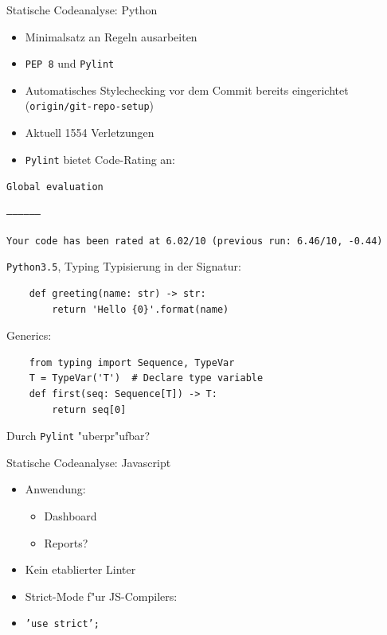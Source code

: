 \documentclass{beamer}
\newcommand{\cmark}{\ding{51}}
\begin{document}
\begin{frame}{Statische Codeanalyse: Python}
	\begin{itemize}
		\item Minimalsatz an Regeln ausarbeiten		
		\item \texttt{PEP\,8} und \texttt{Pylint}
		\item Automatisches Stylechecking vor dem Commit bereits eingerichtet (\texttt{origin/git-repo-setup})
		\item Aktuell 1554 Verletzungen
		\item \texttt{Pylint} bietet Code-Rating an:
	\end{itemize}
	\begin{center}
		\begin{minipage}{.8\textwidth}
			\texttt{Global evaluation}

			\texttt{-----------------}

			\texttt{Your code has been rated at 6.02/10 (previous run: 6.46/10, -0.44)}
		\end{minipage}
	\end{center}
\end{frame}

\begin{frame}[fragile]{\texttt{Python3.5}, Typing}
Typisierung in der Signatur:
	\begin{verbatim}
	def greeting(name: str) -> str:
	    return 'Hello {0}'.format(name)
	\end{verbatim}
Generics:
	\begin{verbatim}
	from typing import Sequence, TypeVar
	T = TypeVar('T')  # Declare type variable
	def first(seq: Sequence[T]) -> T:
    	return seq[0]
	\end{verbatim}
Durch \texttt{Pylint} "uberpr"ufbar?
\end{frame}

\begin{frame}{Statische Codeanalyse: Javascript}
	\begin{itemize}
		\item Anwendung:
			\begin{itemize}
				\item Dashboard \cmark
				\item Reports?
			\end{itemize}
		\item Kein etablierter Linter
		\item Strict-Mode f"ur JS-Compilers:
		\item[] \texttt{'use strict';}
	\end{itemize}
\end{frame}
\end{document}
